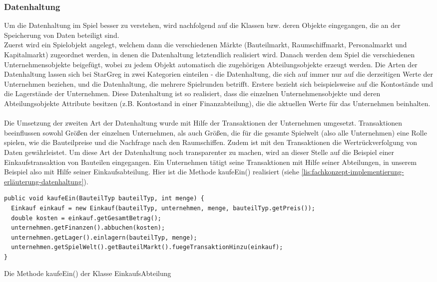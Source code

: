 \subsubsection{Datenhaltung}
\label{subsub:fachkonzept-implementierung-erläuterung-datenhaltung}

Um die Datenhaltung im Spiel besser zu verstehen, wird nachfolgend auf die Klassen bzw. deren Objekte eingegangen, die an der Speicherung von Daten beteiligt sind.
\\
Zuerst wird ein Spielobjekt angelegt, welchem dann die verschiedenen Märkte (Bauteilmarkt, Raumschiffmarkt, Personalmarkt und Kapitalmarkt) zugeordnet werden, in denen die Datenhaltung letztendlich realisiert wird. Danach werden dem Spiel die verschiedenen Unternehmensobjekte beigefügt, wobei zu jedem Objekt automatisch die zugehörigen Abteilungsobjekte erzeugt werden. Die Arten der Datenhaltung lassen sich bei StarGreg in zwei Kategorien einteilen - die Datenhaltung, die sich auf immer nur auf die derzeitigen Werte der Unternehmen beziehen, und die Datenhaltung, die mehrere Spielrunden betrifft. Erstere bezieht sich beispielsweise auf die Kontostände und die Lagerstände der Unternehmen. Diese Datenhaltung ist so realisiert, dass die einzelnen Unternehmensobjekte und deren Abteilungsobjekte Attribute besitzen (z.B. Kontostand in einer Finanzabteilung), die die aktuellen Werte für das Unternehmen beinhalten.
\\
\\
Die Umsetzung der zweiten Art der Datenhaltung wurde mit Hilfe der Transaktionen der Unternehmen umgesetzt. Transaktionen beeinflussen sowohl Größen der einzelnen Unternehmen, als auch Größen, die für die gesamte Spielwelt (also alle Unternehmen) eine Rolle spielen, wie die Bauteilpreise und die Nachfrage nach den Raumschiffen. Zudem ist mit den Transaktionen die Wertrückverfolgung von Daten gewährleistet. Um diese Art der Datenhaltung noch transparenter zu machen, wird an dieser Stelle auf die Beispiel einer Einkaufstransaktion von Bauteilen eingegangen. Ein Unternehmen tätigt seine Transaktionen mit Hilfe seiner Abteilungen, in unserem Beispiel also mit Hilfe seiner Einkaufsabteilung. Hier ist die Methode kaufeEin() realisiert (siehe \ref{lis:fachkonzept-implementierung-erläuterung-datenhaltung}).

\begin{programm}[htbp]
\begin{lstlisting}[breaklines=true]
public void kaufeEin(BauteilTyp bauteilTyp, int menge) {
  Einkauf einkauf = new Einkauf(bauteilTyp, unternehmen, menge, bauteilTyp.getPreis());
  double kosten = einkauf.getGesamtBetrag();
  unternehmen.getFinanzen().abbuchen(kosten);
  unternehmen.getLager().einlagern(bauteilTyp, menge);
  unternehmen.getSpielWelt().getBauteilMarkt().fuegeTransaktionHinzu(einkauf);
}
\end{lstlisting}
\caption{Die Methode kaufeEin() der Klasse EinkaufsAbteilung\label{lis:fachkonzept-implementierung-erläuterung-datenhaltung}}
\end{programm}

